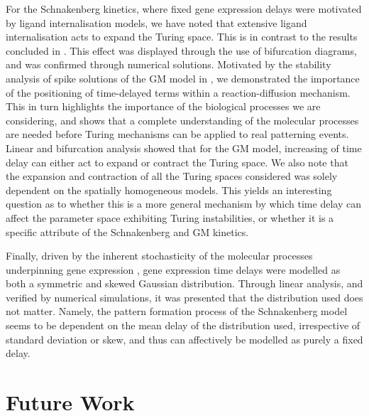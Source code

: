 For the Schnakenberg kinetics, where fixed gene expression delays were motivated by ligand internalisation models, we have noted that extensive ligand internalisation acts to expand the Turing space. This is in contrast to the results concluded in \cite{yigaffneyli}. This effect was displayed through the use of bifurcation diagrams, and was confirmed through numerical solutions.
Motivated by the stability analysis of spike solutions of the GM model in \cite{fadai1,fadai2}, we demonstrated the importance of the positioning of time-delayed terms within a reaction-diffusion mechanism. This in turn highlights the importance of the biological processes we are considering, and shows that a complete understanding of the molecular processes are needed before Turing mechanisms can be applied to real patterning events. Linear and bifurcation analysis showed that for the GM model, increasing of time delay can either act to expand or contract the Turing space. We also note that the expansion and contraction of all the Turing spaces considered was solely dependent on the spatially homogeneous models. This yields an interesting question as to whether this is a more general mechanism by which time delay can affect the parameter space exhibiting Turing instabilities, or whether it is a specific attribute of the Schnakenberg and GM kinetics.

Finally, driven by the inherent stochasticity of the molecular processes underpinning gene expression \cite{raj,elowitz,mcadams,paulsson}, gene expression time delays were modelled as both a symmetric and skewed Gaussian distribution. Through linear analysis, and verified by numerical simulations, it was presented that the distribution used does not matter. Namely, the pattern formation process of the Schnakenberg model seems to be dependent on the mean delay of the distribution used, irrespective of standard deviation or skew, and thus can affectively be modelled as purely a fixed delay.

\section{Future Work}

